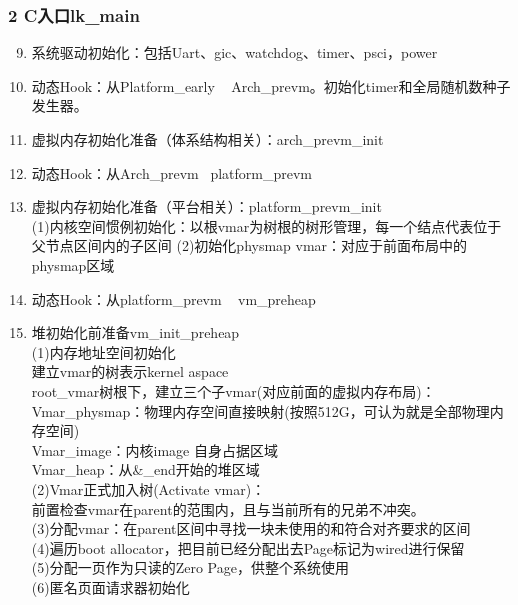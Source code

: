 \documentclass[
8pt, %
]{beamer}
\begin{document}
	\begin{frame}
		\frametitle{2 C入口lk\_main}
		\begin{enumerate}\setcounter{enumi}{8}
			\item 系统驱动初始化：包括Uart、gic、watchdog、timer、psci，power
			\item 动态Hook：从Platform\_early ~ Arch\_prevm。初始化timer和全局随机数种子发生器。
			\item 虚拟内存初始化准备（体系结构相关）：arch\_prevm\_init
			\item 动态Hook：从Arch\_prevm ~platform\_prevm
			\item 虚拟内存初始化准备（平台相关）：platform\_prevm\_init\\
			(1)内核空间惯例初始化：以根vmar为树根的树形管理，每一个结点代表位于父节点区间内的子区间
			(2)初始化physmap vmar：对应于前面布局中的physmap区域
			\item 动态Hook：从platform\_prevm ~ vm\_preheap
			\item 堆初始化前准备vm\_init\_preheap\\
			(1)内存地址空间初始化\\
			建立vmar的树表示kernel aspace\\
			root\_vmar树根下，建立三个子vmar(对应前面的虚拟内存布局)：\\
			Vmar\_physmap：物理内存空间直接映射(按照512G，可认为就是全部物理内存空间)\\
			Vmar\_image：内核image 自身占据区域\\
			Vmar\_heap：从\&\_end开始的堆区域\\
			(2)Vmar正式加入树(Activate vmar)：\\
			前置检查vmar在parent的范围内，且与当前所有的兄弟不冲突。\\
			(3)分配vmar：在parent区间中寻找一块未使用的和符合对齐要求的区间\\
			(4)遍历boot allocator，把目前已经分配出去Page标记为wired进行保留\\
			(5)分配一页作为只读的Zero Page，供整个系统使用\\
			(6)匿名页面请求器初始化
		\end{enumerate}
	\end{frame}
\end{document}
